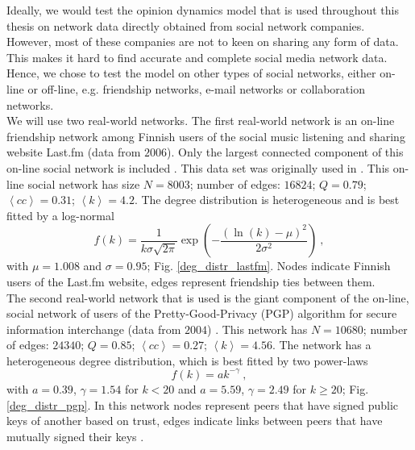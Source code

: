 \documentclass[11 pt , letterpaper , twoside , openright]{book}
\begin{document}
\newline
Ideally, we would test the opinion dynamics model that is used throughout this thesis on network data directly obtained from social network companies. However, most of these companies are not to keen on sharing any form of data. This makes it hard to find accurate and complete social media network data. Hence, we chose to test the model on other types of social networks, either on-line or off-line, e.g. friendship networks, e-mail networks or collaboration networks. \\
\newline
We will use two real-world networks. The first real-world network is an on-line friendship network among Finnish users of the social music listening and sharing website Last.fm (data from $2006$). Only the largest connected component of this on-line social network is included \cite{ICON}. This data set was originally used in \cite{Toivonen2009}. This on-line social network has size $N = 8003$; number of edges: $16824$; $Q = 0.79$; $\left<cc\right> = 0.31$; $\left<k\right> = 4.2$. The degree distribution is heterogeneous and is best fitted by a log-normal
\begin{equation}
	f(k) = \frac{1}{k \sigma \sqrt{2\pi}} \exp(-\frac{(\ln(k) - \mu)^2}{2 \sigma^2})\ ,
\end{equation}
with $\mu = 1.008$ and $\sigma = 0.95$; Fig. \ref{deg_distr_lastfm}. Nodes indicate Finnish users of the Last.fm website, edges represent friendship ties between them.\\
\newline
The second real-world network that is used is the giant component of the on-line, social network of users of the Pretty-Good-Privacy (PGP) algorithm for secure information interchange (data from $2004$) \cite{Boguna2004}\cite{ICON}. This network has $N = 10680$; number of edges: $24340$; $Q = 0.85$; $\left<cc\right> = 0.27$; $\left<k\right> = 4.56$. The network has a heterogeneous degree distribution, which is best fitted by two power-laws
\begin{equation}
 f(k) = a k^{-\gamma} \ ,
\end{equation}
with $a = 0.39$, $\gamma = 1.54$ for $k < 20$ and $a = 5.59$, $\gamma = 2.49$ for $k \geqslant 20$; Fig. \ref{deg_distr_pgp}. In this network nodes represent peers that have signed public keys of another based on trust, edges indicate links between peers that have mutually signed their keys \cite{Boguna2004}.
\end{document}
